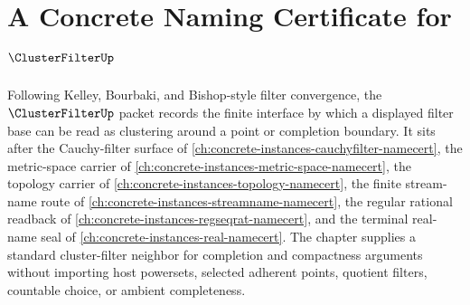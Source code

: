 \chapter{A Concrete Naming Certificate for $\ClusterFilterUp$}
\label{ch:concrete-instances-cluster-filter-namecert}

Following Kelley, Bourbaki, and Bishop-style filter convergence, the $\ClusterFilterUp$ packet records the finite interface by which a displayed filter base can be read as clustering around a point or completion boundary. It sits after the Cauchy-filter surface of \autoref{ch:concrete-instances-cauchyfilter-namecert}, the metric-space carrier of \autoref{ch:concrete-instances-metric-space-namecert}, the topology carrier of \autoref{ch:concrete-instances-topology-namecert}, the finite stream-name route of \autoref{ch:concrete-instances-streamname-namecert}, the regular rational readback of \autoref{ch:concrete-instances-regseqrat-namecert}, and the terminal real-name seal of \autoref{ch:concrete-instances-real-namecert}. The chapter supplies a standard cluster-filter neighbor for completion and compactness arguments without importing host powersets, selected adherent points, quotient filters, countable choice, or ambient completeness.

